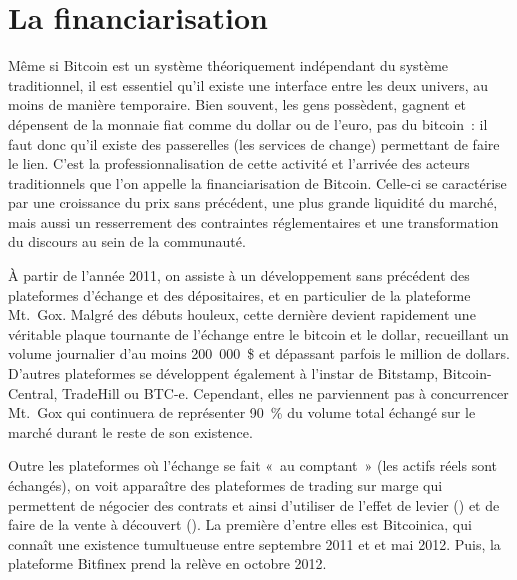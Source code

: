 \section{La financiarisation} %

Même si Bitcoin est un système théoriquement indépendant du système traditionnel, il est essentiel qu'il existe une interface entre les deux univers, au moins de manière temporaire. Bien souvent, les gens possèdent, gagnent et dépensent de la monnaie fiat comme du dollar ou de l'euro, pas du bitcoin~: il faut donc qu'il existe des passerelles (les services de change) permettant de faire le lien. C'est la professionnalisation de cette activité et l'arrivée des acteurs traditionnels que l'on appelle la financiarisation de Bitcoin. Celle-ci se caractérise par une croissance du prix sans précédent, une plus grande liquidité du marché, mais aussi un resserrement des contraintes réglementaires et une transformation du discours au sein de la communauté.


À partir de l'année 2011, on assiste à un développement sans précédent des plateformes d'échange et des dépositaires, et en particulier de la plateforme Mt.~Gox. Malgré des débuts houleux, cette dernière devient rapidement une véritable plaque tournante de l'échange entre le bitcoin et le dollar, recueillant un volume journalier d'au moins 200~000~\$ et dépassant parfois le million de dollars. D'autres plateformes se développent également à l'instar de Bitstamp, Bitcoin-Central, TradeHill ou BTC-e. Cependant, elles ne parviennent pas à concurrencer Mt.~Gox qui continuera de représenter 90~\% du volume total échangé sur le marché durant le reste de son existence.

Outre les plateformes où l'échange se fait «~au comptant~» (les actifs réels sont échangés), on voit apparaître des plateformes de trading sur marge qui permettent de négocier des contrats et ainsi d'utiliser de l'effet de levier () et de faire de la vente à découvert (). La première d'entre elles est Bitcoinica, qui connaît une existence tumultueuse entre septembre 2011 et et mai 2012. Puis, la plateforme Bitfinex prend la relève en octobre 2012.

